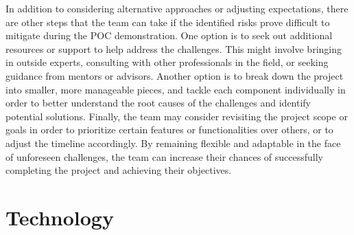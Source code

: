 \documentclass{article}
\begin{document}
In addition to considering alternative approaches or adjusting expectations, there are other steps that the team can take if the identified risks prove difficult to mitigate during the POC demonstration. One option is to seek out additional resources or support to help address the challenges. This might involve bringing in outside experts, consulting with other professionals in the field, or seeking guidance from mentors or advisors. Another option is to break down the project into smaller, more manageable pieces, and tackle each component individually in order to better understand the root causes of the challenges and identify potential solutions. Finally, the team may consider revisiting the project scope or goals in order to prioritize certain features or functionalities over others, or to adjust the timeline accordingly. By remaining flexible and adaptable in the face of unforeseen challenges, the team can increase their chances of successfully completing the project and achieving their objectives.

\section{Technology}
\end{document}

